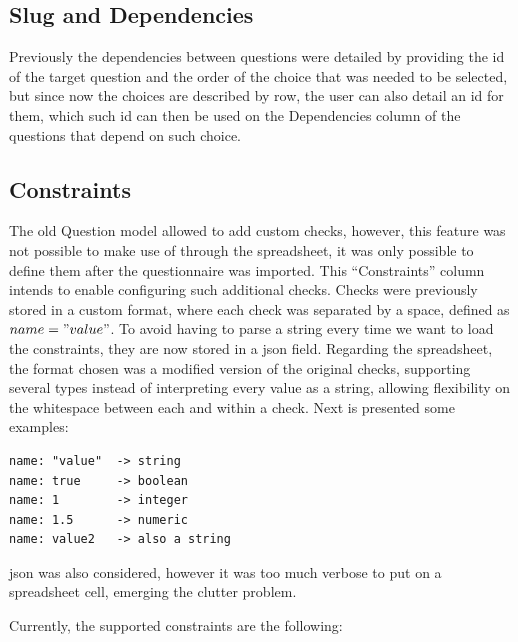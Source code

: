\subsection*{Slug and Dependencies}

Previously the dependencies between questions were detailed by providing the id of the target question and the order of the choice that was needed to be selected, but since now the choices are described by row, the user can also detail an id for them, which such id can then be used on the Dependencies column of the questions that depend on such choice.

\subsection*{Constraints}

The old Question model allowed to add custom checks, however, this feature was not possible to make use of through the spreadsheet, it was only possible to define them after the questionnaire was imported.
This ``Constraints'' column intends to enable configuring such additional checks.
Checks were previously stored in a custom format, where each check was separated by a space, defined as $name="value"$.
To avoid having to parse a string every time we want to load the constraints, they are now stored in a \gls{json} field.
Regarding the spreadsheet, the format chosen was a modified version of the original checks, supporting several types instead of interpreting every value as a string, allowing flexibility on the whitespace between each and within a check.
Next is presented some examples:

\begin{verbatim}
name: "value"  -> string
name: true     -> boolean
name: 1        -> integer
name: 1.5      -> numeric
name: value2   -> also a string
\end{verbatim}

\gls{json} was also considered, however it was too much verbose to put on a spreadsheet cell, emerging the clutter problem.

Currently, the supported constraints are the following:

